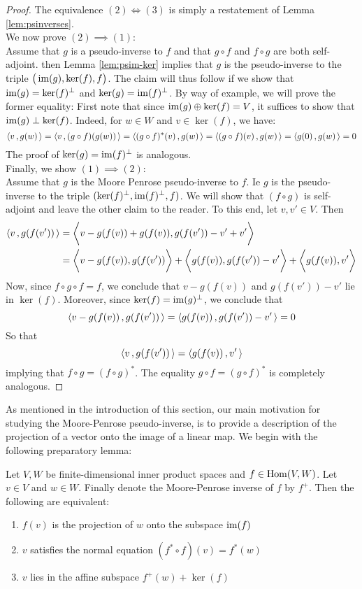 \documentclass{dsp}
\begin{document}
\begin{proof}
	The equivalence $(2)\iff (3)$ is simply a restatement of Lemma \ref{lem:psinverses}.\\
	We now prove $(2)\implies (1)$:\\
	Assume that $g$ is a pseudo-inverse to $f$ and that $g\circ f$ and $f \circ g$ are both self-adjoint. then Lemma \ref{lem:psim-ker} implies that $g$ is the pseudo-inverse to the triple $\big(\operatorname{im}(g),\ker(f),f\big)$. The claim will thus follow if we show that $\operatorname{im}(g)=\ker(f)^\perp$ and $\ker(g)=\operatorname{im}(f)^\perp$. By way of example, we will prove the former equality: First note that since $\operatorname{im}(g)\oplus \ker(f)=V$, it suffices to show that $\operatorname{im}(g)\perp \ker(f)$. Indeed, for $w \in W$ and $v \in \ker(f)$, we have: 
	\[
	\left\langle v\,,g(w)\, \right\rangle=\left\langle v\,,(g\circ f)(g(w))\, \right\rangle=\left\langle (g\circ f)^*(v)\,,g(w)\, \right\rangle=\left\langle (g\circ f)(v)\,,g(w)\, \right\rangle=\left\langle g(0)\,,g(w)\, \right\rangle=0
	\]
	The proof of $\ker(g)=\operatorname{im}(f)^\perp$ is analogous.\\
	Finally, we show $(1)\implies (2)$:\\
	Assume that $g$ is the Moore Penrose pseudo-inverse to $f$. Ie $g$ is the  pseudo-inverse to the triple $(\ker(f)^\perp,\operatorname{im}(f)^\perp,f)$. We will show that $(f\circ g)$ is self-adjoint and leave the other claim to the reader. To this end, let $v,v' \in V$. Then
	\begin{align*}
	\left\langle v\,,g(f(v'))\, \right\rangle&=\bigg\langle v-g(f(v))+g(f(v)), g(f(v'))-v'+v'\bigg\rangle\\
	&= \bigg\langle v-g(f(v)), g(f(v'))\bigg\rangle+\bigg\langle g(f(v)),g(f(v'))-v'\bigg\rangle+\bigg\langle g(f(v)), v'\bigg\rangle
	\end{align*}
	Now, since $f\circ g\circ f=f$, we conclude that $v-g(f(v))$ and $g(f(v'))-v'$ lie in $\ker(f)$. Moreover, since $\ker(f)=\operatorname{im}(g)^\perp$, we conclude that 
	\[
	\left\langle v-g(f(v))\,,g(f(v'))\, \right\rangle=\left\langle g(f(v))\,,g(f(v'))-v'\, \right\rangle=0
	\]
	So that 
	\[
	\left\langle v\,,g(f(v'))\, \right\rangle=\left\langle g(f(v))\,,v'\, \right\rangle
	\] implying that $f\circ g=(f\circ g)^*$. The equality $g\circ f = (g\circ f)^*$ is completely analogous.
\end{proof}

As mentioned in the introduction of this section, our main motivation for studying the Moore-Penrose pseudo-inverse, is to provide a description of the projection of a vector onto the image of a linear map. We begin with the following preparatory lemma:



\begin{lemma}\label{lem:proj=mppsinverse}
	Let $V,W$ be finite-dimensional inner product spaces and  $f \in \operatorname{Hom}(V,W)$. Let $v \in V$ and $w\in W$. Finally denote the Moore-Penrose inverse of $f$ by $f^+$. Then the following are equivalent:
	\begin{enumerate}
		\item $f(v)$ is the projection of $w$ onto the subspace $\operatorname{im}(f)$
		\item $v$ satisfies the normal equation $(f^*\circ f)(v)=f^*(w)$
		\item $v$ lies in the affine subspace $f^+(w) + \ker(f)$
	\end{enumerate}
\end{lemma}
\end{document}
